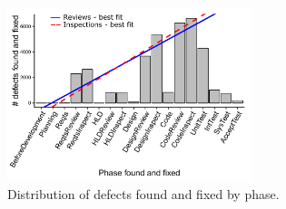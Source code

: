 \documentclass{sig-alternate}
\begin{document}
 
 

\begin{figure}[!b] 

\begin{center}
\includegraphics[height=2in]{img/fix-phase-dist.pdf}
\end{center}

\caption{Distribution of defects found and fixed by phase.}
\label{fig:fix-phase-dist}
\end{figure}
\end{document}
